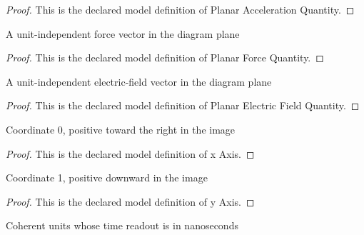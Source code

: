 \begin{proof}
  This is the declared model definition of Planar Acceleration Quantity.
\end{proof}
\begin{definition}
  \label{def:physics:phyx-mini-0993:phyxminiproblems-problemphyxmini0993-planarforcequantity}
  A unit-independent force vector in the diagram plane
\end{definition}
\begin{proof}
  This is the declared model definition of Planar Force Quantity.
\end{proof}
\begin{definition}
  \label{def:physics:phyx-mini-0993:phyxminiproblems-problemphyxmini0993-planarelectricfieldquantity}
  A unit-independent electric-field vector in the diagram plane
\end{definition}
\begin{proof}
  This is the declared model definition of Planar Electric Field Quantity.
\end{proof}
\begin{definition}[x Axis]
  \label{def:physics:phyx-mini-0993:phyxminiproblems-problemphyxmini0993-xaxis}
  Coordinate 0, positive toward the right in the image
\end{definition}
\begin{proof}
  This is the declared model definition of x Axis.
\end{proof}
\begin{definition}[y Axis]
  \label{def:physics:phyx-mini-0993:phyxminiproblems-problemphyxmini0993-yaxis}
  Coordinate 1, positive downward in the image
\end{definition}
\begin{proof}
  This is the declared model definition of y Axis.
\end{proof}
\begin{definition}
  \label{def:physics:phyx-mini-0993:phyxminiproblems-problemphyxmini0993-nanosecondunitchoices}
  Coherent units whose time readout is in nanoseconds
\end{definition}
